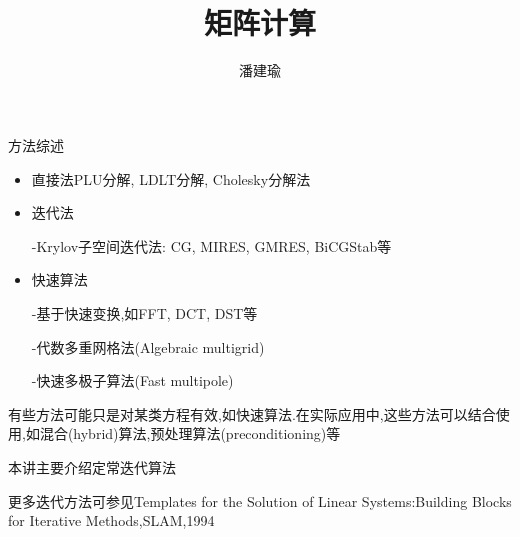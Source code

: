 \documentclass[notheorems,serif]{beamer}
\renewcommand{\normalsize}{\wuhao}
\newcommand{\wuhao}{\fontsize{10.5pt}{\baselineskip}\selectfont}
\begin{document}
\title[数值线性代数]{{\small{}~~~~~~~~~~~~~~~~~~~~~~~~~~~~~~~~~~~~~~~~~~~~~~
~~~~~~~~~~~} \\
矩阵计算
}




\author[]{~~潘建瑜~~}

\institute[湘潭大学数学系]

\date[\today]




\frame[plain]{\titlepage}



\begin{frame}
\large 方法综述
\normalsize
\begin{itemize}
   \item {\color{blue}直接法}\quad PLU分解, LDLT分解, Cholesky分解法
   
   \item {\color{blue}迭代法}
   
         
         
         -Krylov子空间迭代法: CG, MIRES, GMRES, BiCGStab等
   
   \item {\color{blue}快速算法}

         -基于快速变换,如FFT, DCT, DST等

         -代数多重网格法(Algebraic multigrid)

         -快速多极子算法(Fast multipole)

\end{itemize}
有些方法可能只是对某类方程有效,如快速算法.在实际应用中,这些方法可以结合使用,如混合(hybrid)算法,预处理算法(preconditioning)等
\end{frame}



\begin{frame}
\centerline{本讲主要介绍定常迭代算法}
\qquad 

\qquad 

\qquad 

\qquad 

\qquad 

\qquad 


更多迭代方法可参见{\color{blue}Templates for the Solution of Linear Systems:Building Blocks for Iterative Methods,}SLAM,1994
\end{frame}
\end{document}
